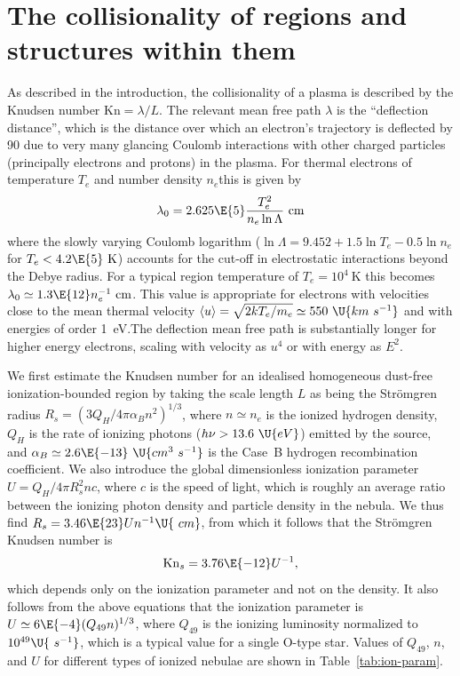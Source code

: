 \documentclass{emulateapj}
\newcommand\Kn{\ensuremath{\mathrm{Kn}}}
\newcommand\kms{\U{km\ s^{-1}}}
\newcommand\hii{\ion{H}{2}}
\newcommand\ubar{\ensuremath{\langle u \rangle}}
\begin{document}
\section{The collisionality of \hii{} regions and structures within
  them}
\label{sec:coll-hii-regi}

As described in the introduction, the collisionality of a plasma is
described by the Knudsen number \(\Kn = \lambda/ L\).
The relevant mean free path \(\lambda\)
is the ``deflection distance'', which is the distance over which an
electron's trajectory is deflected by 90\arcdeg{} due to very many
glancing Coulomb interactions with other charged particles
(principally electrons and protons) in the plasma.  For thermal
electrons of temperature \(T_{e}\)
and number density \(n_{e}\)this is given by
\begin{equation}
  \lambda_0 = 2.625\E{5} \frac{T_{e}^2}{n_{e} \ln\Lambda}\ \mathrm{cm}
  \label{eq:4}
\end{equation}
where the slowly varying Coulomb logarithm
(\(\ln\Lambda = 9.452 + 1.5 \ln T_{e} - 0.5 \ln n_{e} \)
for \(T_{e} < 4.2\E{5}\mathrm{\ K}\))
accounts for the cut-off in electrostatic interactions beyond the
Debye radius.  For a typical \hii{} region temperature of
\(T_{e} = 10^4 \mathrm{\ K}\)
this becomes \(\lambda_0 \simeq 1.3\E{12} n_{e}^{-1} \mathrm{\ cm}\).
This value is appropriate for electrons with velocities close to the
mean thermal velocity
\(\ubar = \sqrt{2 k T_{e}/m_{e}} \simeq 550~\kms\)
and with energies of order 1~eV.\@ The deflection mean free path is
substantially longer for higher energy electrons, scaling with
velocity as \(u^4\) or with energy as \(E^2\).  

We first estimate the Knudsen number for an idealised homogeneous
dust-free ionization-bounded \hii{} region by taking the scale length
\(L\)
as being the Strömgren radius
\(R_{s} = (3 Q_{H} / 4 \pi \alpha_{B} n^2)^{1/3}\),
where \(n \simeq n_{e}\)
is the ionized hydrogen density, \(Q_{H}\)
is the rate of ionizing photons (\(h\nu > 13.6~\U{eV}\))
emitted by the source, and
\(\alpha_{B} \simeq 2.6\E{-13}~\U{cm^3\ s^{-1}}\)
is the Case~B hydrogen recombination coefficient.  We also introduce
the global dimensionless ionization parameter
\(U = Q_{H} / 4 \pi R_{s}^2 n c\),
where \(c\)
is the speed of light, which is roughly an average ratio between the
ionizing photon density and particle density in the nebula.  We thus
find \(R_{s} = 3.46 \E{23} U n^{-1} \U{\ cm}\),
from which it follows that the Strömgren Knudsen number is
\[\Kn_{s} = 3.76\E{-12} U^{-1} ,\]
which depends only on the ionization parameter and not on the density.
It also follows from the above equations that the ionization parameter
is \(U \simeq 6\E{-4} (Q_{49} n)^{1/3}\),
where \(Q_{49}\)
is the ionizing luminosity normalized to \(10^{49}\U{\ s^{-1}}\),
which is a typical value for a single O-type star.  Values of
\(Q_{49}\), \(n\), and \(U\) for different types of ionized nebulae
are shown in Table~\ref{tab:ion-param}.  
\end{document}
